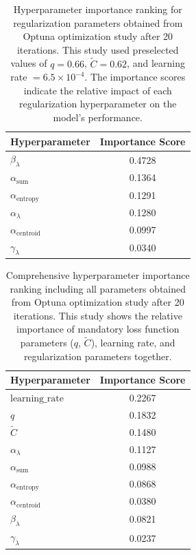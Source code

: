 \begin{table}[h]
  \centering
  \begin{tabular}{lc}
    \toprule
    \textbf{Hyperparameter} & \textbf{Importance Score} \\
    \midrule
    $\beta_\lambda$ & 0.4728 \\
    $\alpha_{\text{sum}}$ & 0.1364 \\
    $\alpha_{\text{entropy}}$ & 0.1291 \\
    $\alpha_{\lambda}$ & 0.1280 \\
    $\alpha_{\text{centroid}}$ & 0.0997 \\
    $\gamma_\lambda$ & 0.0340 \\
    \bottomrule
  \end{tabular}
  \caption{Hyperparameter importance ranking for regularization parameters
    obtained from Optuna optimization study after 20 iterations. This study
    used preselected values of $q=0.66$, $\tilde{C}=0.62$, and learning
    rate $=6.5 \times 10^{-4}$. The importance scores indicate the relative
  impact of each regularization hyperparameter on the model's performance.}
  \label{tab:hyperparameter_importance_regularizers}
\end{table}

\begin{table}[h]
  \centering
  \begin{tabular}{lc}
    \toprule
    \textbf{Hyperparameter} & \textbf{Importance Score} \\
    \midrule
    $\text{learning\_rate}$ & 0.2267 \\
    $q$ & 0.1832 \\
    $\tilde C$ & 0.1480 \\
    $\alpha_{\lambda}$ & 0.1127 \\
    $\alpha_{\text{sum}}$ & 0.0988 \\
    $\alpha_{\text{entropy}}$ & 0.0868 \\
    $\alpha_{\text{centroid}}$ & 0.0380 \\
    $\beta_\lambda$ & 0.0821 \\
    $\gamma_\lambda$ & 0.0237 \\
    \bottomrule
  \end{tabular}
  \caption{Comprehensive hyperparameter importance ranking including all
    parameters obtained from Optuna optimization study after 20 iterations.
    This study shows the relative importance of mandatory loss function
    parameters ($q$, $\tilde{C}$), learning rate, and regularization
  parameters together.}
  \label{tab:hyperparameter_importance_comprehensive}
\end{table}

